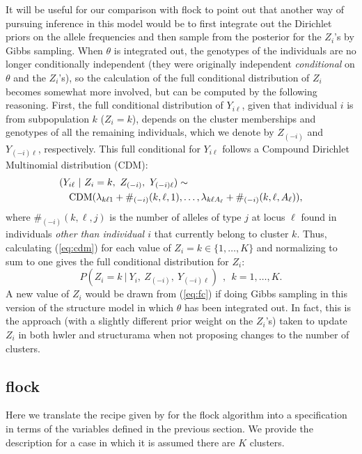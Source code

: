 It will be useful for our comparison with {\sc flock} to point out that another way 
of pursuing inference in this model would be to first integrate out the 
Dirichlet priors on the allele frequencies and then sample from the posterior
for the $Z_i$'s by Gibbs sampling.  When $\theta$ is integrated out, the genotypes 
of the individuals are no longer conditionally independent (they were originally
independent {\em conditional} on $\theta$ and the $Z_i$'s), so the calculation of 
the full conditional distribution of $Z_i$ becomes somewhat more involved,
but can be computed by the following reasoning. First, the full 
conditional distribution of $Y_{i\ell}$, given that individual $i$ is from subpopulation $k$
(\ie $Z_i=k$), depends on the 
cluster memberships and genotypes  of all the remaining individuals,
which we denote by  $Z_{(-i)}$ and $Y_{(-i)\ell}$, respectively.
This full conditional for $Y_{i\ell}$ follows 
a Compound Dirichlet Multinomial distribution (CDM):
\begin{eqnarray}
\lefteqn{(Y_{i\ell}~|~Z_i=k,~Z_{(-i)},~Y_{(-i)\ell}) \sim} \label{eq:cdm}\\
& & \mathrm{CDM}(\lambda_{k\ell 1} + \#_{(-i)}(k,\ell,1), \ldots,
\lambda_{k\ell A_\ell} + \#_{(-i)}(k,\ell,A_\ell)), \nonumber
\end{eqnarray}
where $\#_{(-i)}(k,\ell,j)$ is the number of alleles of type $j$ at locus $\ell$
found in individuals {\em other than individual $i$} that currently
belong to cluster $k$. Thus, calculating (\ref{eq:cdm}) for each value of $Z_i=k \in 
\{1,\ldots,K\}$ 
and normalizing to sum to one gives the full conditional distribution for 
$Z_i$:
\begin{equation}
P(Z_i=k~|~Y_i, ~Z_{(-i)},~Y_{(-i)\ell})~~,~~k=1,\ldots,K.
\label{eq:fc}
\end{equation}
A new value of $Z_i$ would be drawn from (\ref{eq:fc}) if doing Gibbs sampling in this
version of the {\sc structure} model in which $\theta$ has been integrated out.  In 
fact,
this is the approach (with a slightly different prior weight on the $Z_i$'s) taken to 
update 
$Z_i$ in both {\sc hwler} \citep{Pel&Mas2006} and {\sc structurama} \cite{Hue&And2007} 
when not
proposing changes to the number of clusters.



\subsection*{{\sc flock}}
Here we translate the recipe given by \citeauthor{Duc&Tur2009} for the 
{\sc flock} algorithm into a specification in terms of the variables
defined in the previous section.  We provide the description for a case in which
it is assumed there are $K$ clusters.

